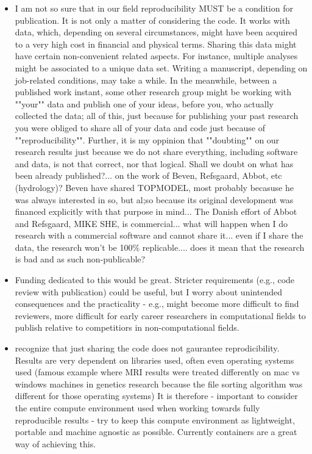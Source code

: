 \documentclass{article}
\begin{document}
\begin{itemize}
	\item I am not so sure that in our field reproducibility MUST be a condition for publication. It is not only a matter of considering the code. It works with data, which, depending on several circumstances, might have been acquired to a very high cost in financial and physical terms. Sharing this data might have certain non-convenient related aspects. For instance, multiple analyses might be associated to a unique data set. Writing a manuscript, depending on job-related conditions, may take a while. In the meanwhile, between a published work instant, some other research group might be working with ""your"" data and publish one of your ideas, before you, who actually collected the data; all of this, just because for publishing your past research you were obliged to share all of your data and code just because of ""reproducibility"". Further, it is my oppinion that ""doubting"" on our research results just because we do not share everything, including software and data, is not that  correct, nor that logical. Shall we doubt on what has been already published?... on the work of Beven, Refsgaard, Abbot, etc (hydrology)? Beven have shared TOPMODEL, most probably becasuse he was always interested in so, but al;so because its original development was financed explicitly with that purpose in mind... The Danish effort of Abbot and Refsgaard, MIKE SHE, is commercial... what will happen when I do research with a commercial software and cannot share it... even if I share the data, the research won't be 100\% replicable.... does it mean that the research is bad and as such non-publicable?
	\item Funding dedicated to this would be great. Stricter requirements (e.g., code review with publication) could be useful, but I worry about unintended consequences and the practicality - e.g., might become more difficult to find reviewers, more difficult for early career researchers in computational fields to publish relative to competitiors in non-computational fields.
	\item recognize that just sharing the code does not gaurantee reprodicibility. Results are very dependent on libraries used, often even operating systems used (famous example where MRI results were treated differently on mac vs windows machines in genetics research because the file sorting algorithm was different for those operating systems)
It is therefore 
- important to consider the entire compute environment used when working towards fully reproducible results
- try to keep this compute environment as lightweight, portable and machine agnostic as possible. Currently containers are a great way of achieving this.

\end{itemize}
\end{document}
